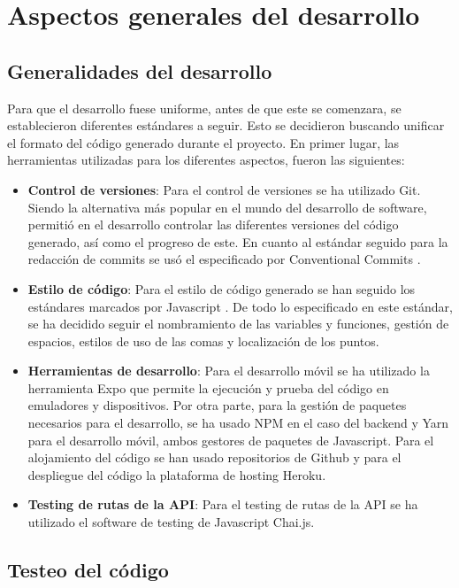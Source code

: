 \section{Aspectos generales del desarrollo}

\subsection{Generalidades del desarrollo}

Para que el desarrollo fuese uniforme, antes de que este se comenzara, se establecieron diferentes estándares a seguir. Esto se decidieron buscando unificar el formato del código generado durante el proyecto. En primer lugar, las herramientas utilizadas para los diferentes aspectos, fueron las siguientes:

\begin{itemize}
    \item \textbf{Control de versiones}: Para el control de versiones se ha utilizado Git. Siendo la alternativa más popular en el mundo del desarrollo de software, permitió en el desarrollo controlar las diferentes versiones del código generado, así como el progreso de este. En cuanto al estándar seguido para la redacción de commits se usó el especificado por Conventional Commits \cite{standardgit}.
    \item \textbf{Estilo de código}: Para el estilo de código generado se han seguido los estándares marcados por Javascript \cite{standardjs}. De todo lo especificado en este estándar, se ha decidido seguir el nombramiento de las variables y funciones, gestión de espacios, estilos de uso de las comas y localización de los puntos.
    \item \textbf{Herramientas de desarrollo}: Para el desarrollo móvil se ha utilizado la herramienta Expo que permite la ejecución y prueba del código en emuladores y dispositivos. Por otra parte, para la gestión de paquetes necesarios para el desarrollo, se ha usado NPM en el caso del backend y Yarn para el desarrollo móvil, ambos gestores de paquetes de Javascript. Para el alojamiento del código se han usado repositorios de Github y para el despliegue del código la plataforma de hosting Heroku.
    \item \textbf{Testing de rutas de la API}: Para el testing de rutas de la API se ha utilizado el software de testing de Javascript Chai.js.
\end{itemize}

\subsection{Testeo del código}

